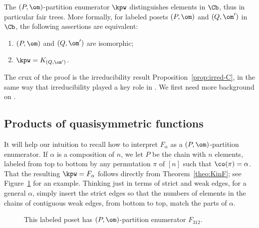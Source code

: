 \begin{theorem}\label{thm:fair-trees}
The $(P,\om)$-partition enumerator $\kpw$ distinguishes elements in $\Cb$, 
thus in particular fair trees. More formally, for labeled posets $(P,\om)$ and $(Q,\om')$ in $\Cb$,
the following assertions are equivalent:
\begin{enumerate}
\item $(P,\om)$ and $(Q,\om')$ are isomorphic;
\item $\kpw=K_{(Q,\om')}$.
\end{enumerate}
\end{theorem}

The crux of the proof is the irreducibility result Proposition~\ref{prop:irred-C}, in the same way that irreducibility played a key role in \cite{HaTs17,LiWe21}.  We first need more background on \qsym.

\subsection{Products of quasisymmetric functions}\label{sub:prods_qsym}

It will help our intuition to recall how to interpret $F_\alpha$ as a $(P,\om)$-partition enumerator.  If $\alpha$ is a composition of $n$, we let $P$ be the chain with $n$ elements, labeled from top to bottom by any permutation $\pi$ of $[n]$ such that $\co(\pi) = \alpha$.  That the resulting $\kpw = F_\alpha$ follows directly from Theorem~\ref{theo:KinF}; see Figure~\ref{fig:f_poset} for an example.  Thinking just in terms of strict and weak edges, for a general $\alpha$, simply insert the strict edges so that the numbers of elements in the chains of contiguous weak edges, from bottom to top, match the parts of $\alpha$.
\begin{figure}
\begin{center}
\end{center}
\caption{This labeled poset has $(P,\om)$-partition enumerator $F_{312}$.}
\label{fig:f_poset}
\end{figure}

